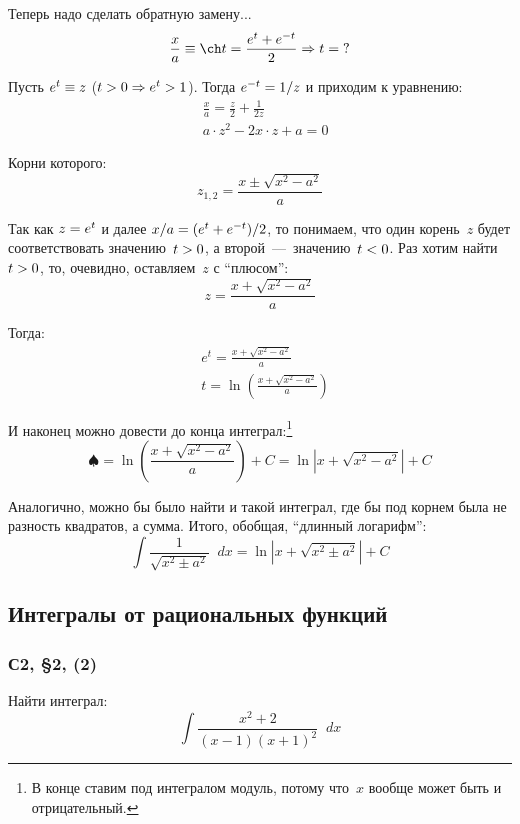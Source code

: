 \documentclass[a4paper,12pt]{article}
\newcommand{\diff}{\mathop{}\!d}
\begin{document}
  Теперь надо сделать обратную замену...
  \[
    \frac{x}{a} \equiv \ch t = \frac{e^t + e^{-t}}{2} \Rightarrow t = \?
  \]

  Пусть $e^t \hm\equiv z$ ($t \hm> 0 \hm\Rightarrow e^t \hm> 1$).
  Тогда $e^{-t} \hm= 1\hm/ z$ и приходим к уравнению:
  \[
    \begin{aligned}
      &\frac{x}{a} = \frac{z}{2} + \frac{1}{2z}\\
      &a \cdot z^2-2x \cdot z + a = 0
    \end{aligned}
  \]

  Корни которого:
  \[
    z_{1,2} = \frac{x \pm \sqrt{x^2 - a^2}}{a}
  \]

  Так как $z \hm= e^t$ и далее $x\hm/a \hm= (e^t \hm+ e^{-t}) \hm/ 2$, то понимаем, что один корень~$z$ будет соответствовать значению~$t \hm> 0$, а второй~---~значению~$t \hm< 0$.
  Раз хотим найти $t \hm> 0$, то, очевидно, оставляем~$z$ с ``плюсом'':
  \[
    z = \frac{x + \sqrt{x^2 - a^2}}{a}
  \]

  Тогда:
  \[
    \begin{aligned}
      &e^t = \frac{x + \sqrt{x^2 - a^2}}{a}\\
      &t = \ln \left(\frac{x + \sqrt{x^2 - a^2}}{a}\right)
    \end{aligned}
  \]

  И наконец можно довести до конца интеграл:\footnote{
    В конце ставим под интегралом модуль, потому что~$x$ вообще может быть и отрицательный.
  }
  \[
    \spadesuit = \ln \left(\frac{x + \sqrt{x^2 - a^2}}{a}\right) + C = \ln \left|x + \sqrt{x^2 - a^2}\right| + C
  \]

  Аналогично, можно бы было найти и такой интеграл, где бы под корнем была не разность квадратов, а сумма.
  Итого, обобщая, ``длинный логарифм'':
  \[
    \int \frac{1}{\sqrt{x^2 \pm a^2}} \diff x = \ln \left|x + \sqrt{x^2 \pm a^2}\right| + C
  \]
  

  \subsection{Интегралы от рациональных функций}
  
  \subsubsection{С2, \S 2, (2)}

  Найти интеграл:
  \begin{equation}\label{eq:2-3(2)-int}
    \int \frac{x^2 + 2}{(x - 1) (x + 1)^2} \diff x
  \end{equation}
  
\end{document}

